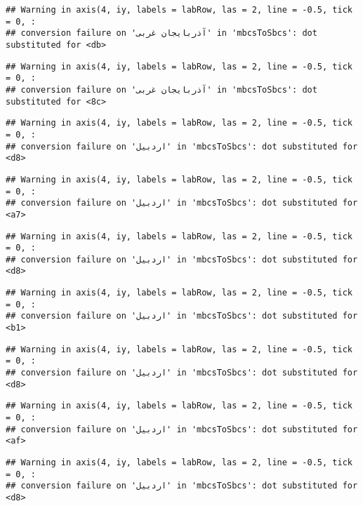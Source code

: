 \documentclass[
]{article}
\begin{document}
\begin{verbatim}
## Warning in axis(4, iy, labels = labRow, las = 2, line = -0.5, tick = 0, :
## conversion failure on 'آذربايجان غربی' in 'mbcsToSbcs': dot substituted for <db>
\end{verbatim}

\begin{verbatim}
## Warning in axis(4, iy, labels = labRow, las = 2, line = -0.5, tick = 0, :
## conversion failure on 'آذربايجان غربی' in 'mbcsToSbcs': dot substituted for <8c>
\end{verbatim}

\begin{verbatim}
## Warning in axis(4, iy, labels = labRow, las = 2, line = -0.5, tick = 0, :
## conversion failure on 'اردبیل' in 'mbcsToSbcs': dot substituted for <d8>
\end{verbatim}

\begin{verbatim}
## Warning in axis(4, iy, labels = labRow, las = 2, line = -0.5, tick = 0, :
## conversion failure on 'اردبیل' in 'mbcsToSbcs': dot substituted for <a7>
\end{verbatim}

\begin{verbatim}
## Warning in axis(4, iy, labels = labRow, las = 2, line = -0.5, tick = 0, :
## conversion failure on 'اردبیل' in 'mbcsToSbcs': dot substituted for <d8>
\end{verbatim}

\begin{verbatim}
## Warning in axis(4, iy, labels = labRow, las = 2, line = -0.5, tick = 0, :
## conversion failure on 'اردبیل' in 'mbcsToSbcs': dot substituted for <b1>
\end{verbatim}

\begin{verbatim}
## Warning in axis(4, iy, labels = labRow, las = 2, line = -0.5, tick = 0, :
## conversion failure on 'اردبیل' in 'mbcsToSbcs': dot substituted for <d8>
\end{verbatim}

\begin{verbatim}
## Warning in axis(4, iy, labels = labRow, las = 2, line = -0.5, tick = 0, :
## conversion failure on 'اردبیل' in 'mbcsToSbcs': dot substituted for <af>
\end{verbatim}

\begin{verbatim}
## Warning in axis(4, iy, labels = labRow, las = 2, line = -0.5, tick = 0, :
## conversion failure on 'اردبیل' in 'mbcsToSbcs': dot substituted for <d8>
\end{verbatim}
\end{document}
